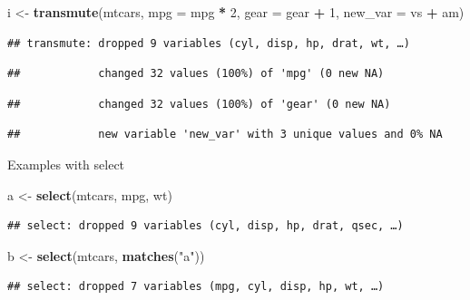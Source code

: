 \documentclass[
]{book}
\newenvironment{Shaded}{\begin{snugshade}}{\end{snugshade}}
\newcommand{\DataTypeTok}[1]{\textcolor[rgb]{0.13,0.29,0.53}{#1}}
\newcommand{\DecValTok}[1]{\textcolor[rgb]{0.00,0.00,0.81}{#1}}
\newcommand{\KeywordTok}[1]{\textcolor[rgb]{0.13,0.29,0.53}{\textbf{#1}}}
\newcommand{\NormalTok}[1]{#1}
\newcommand{\OperatorTok}[1]{\textcolor[rgb]{0.81,0.36,0.00}{\textbf{#1}}}
\newcommand{\StringTok}[1]{\textcolor[rgb]{0.31,0.60,0.02}{#1}}
\begin{document}
\begin{Shaded}
\begin{Highlighting}[]
\NormalTok{i <-}\StringTok{ }\KeywordTok{transmute}\NormalTok{(mtcars, }\DataTypeTok{mpg =}\NormalTok{ mpg }\OperatorTok{*}\StringTok{ }\DecValTok{2}\NormalTok{, }\DataTypeTok{gear =}\NormalTok{ gear }\OperatorTok{+}\StringTok{ }\DecValTok{1}\NormalTok{, }\DataTypeTok{new_var =}\NormalTok{ vs }\OperatorTok{+}\StringTok{ }\NormalTok{am)}
\end{Highlighting}
\end{Shaded}

\begin{verbatim}
## transmute: dropped 9 variables (cyl, disp, hp, drat, wt, …)
\end{verbatim}

\begin{verbatim}
##            changed 32 values (100%) of 'mpg' (0 new NA)
\end{verbatim}

\begin{verbatim}
##            changed 32 values (100%) of 'gear' (0 new NA)
\end{verbatim}

\begin{verbatim}
##            new variable 'new_var' with 3 unique values and 0% NA
\end{verbatim}

Examples with select

\begin{Shaded}
\begin{Highlighting}[]
\NormalTok{a <-}\StringTok{ }\KeywordTok{select}\NormalTok{(mtcars, mpg, wt)}
\end{Highlighting}
\end{Shaded}

\begin{verbatim}
## select: dropped 9 variables (cyl, disp, hp, drat, qsec, …)
\end{verbatim}

\begin{Shaded}
\begin{Highlighting}[]
\NormalTok{b <-}\StringTok{ }\KeywordTok{select}\NormalTok{(mtcars, }\KeywordTok{matches}\NormalTok{(}\StringTok{"a"}\NormalTok{))}
\end{Highlighting}
\end{Shaded}

\begin{verbatim}
## select: dropped 7 variables (mpg, cyl, disp, hp, wt, …)
\end{verbatim}
\end{document}
